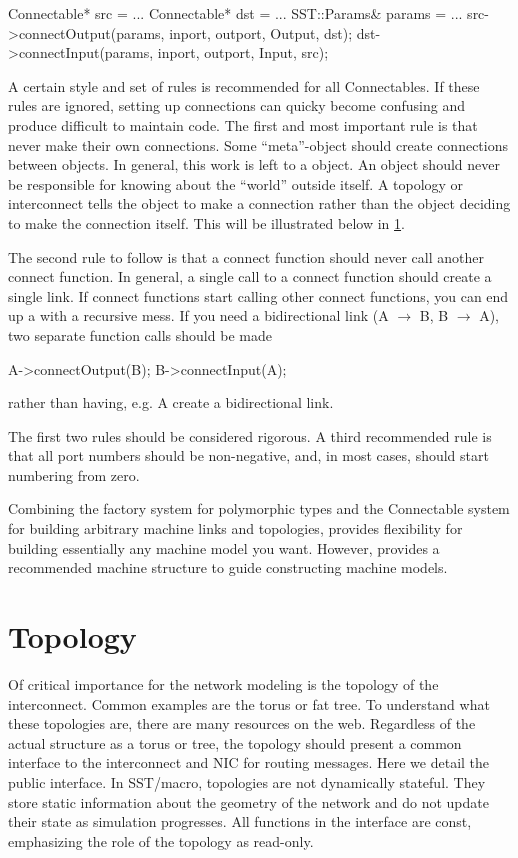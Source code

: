 \begin{CppCode}
Connectable* src = ...
Connectable* dst = ...
SST::Params& params = ...
src->connectOutput(params, inport, outport, Output, dst);
dst->connectInput(params, inport, outport, Input, src);
\end{CppCode}

A certain style and set of rules is recommended for all Connectables.
If these rules are ignored, setting up connections can quicky become confusing and produce difficult to maintain code.
The first and most important rule is that  never make their own connections.
Some ``meta''-object should create connections between objects.
In general, this work is left to a  object.
An object should never be responsible for knowing about the ``world'' outside itself.
A topology or interconnect tells the object to make a connection rather than the object deciding to make the connection itself.
This will be illustrated below in \ref{sec:topology}.

The second rule to follow is that a connect function should never call another connect function.
In general, a single call to a connect function should create a single link.
If connect functions start calling other connect functions, you can end up a with a recursive mess.
If you need a bidirectional link (A $\rightarrow$ B, B $\rightarrow$ A),
two separate function calls should be made

\begin{CppCode}
A->connectOutput(B);
B->connectInput(A);
\end{CppCode}

rather than having, e.g. A create a bidirectional link.

The first two rules should be considered rigorous. 
A third recommended rule is that all port numbers should be non-negative, and, in most cases, should start numbering from zero.


Combining the factory system for polymorphic types and the Connectable system for building arbitrary machine links and topologies,
\sstmacro provides flexibility for building essentially any machine model you want.
However, \sstmacro provides a recommended machine structure to guide constructing machine models.

\section{Topology}
\label{sec:topology}
Of critical importance for the network modeling is the topology of the interconnect.
Common examples are the torus or fat tree.
To understand what these topologies are, there are many resources on the web.
Regardless of the actual structure as a torus or tree, the topology should present a common interface to the interconnect and NIC for routing messages.
Here we detail the public interface.
In SST/macro, topologies are not dynamically stateful.
They store static information about the geometry of the network and do not update their state as simulation progresses.
All functions in the interface are const, emphasizing the role of the topology as read-only.

